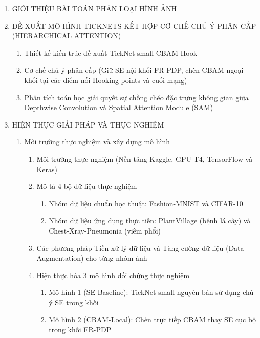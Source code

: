 \documentclass[
]{article}
\begin{document}
\begin{enumerate}
\def\labelenumi{3.\arabic{enumi}.}
\item
  GIỚI THIỆU BÀI TOÁN PHÂN LOẠI HÌNH ẢNH
\item
  ĐỀ XUẤT MÔ HÌNH TICKNETS KẾT HỢP CƠ CHẾ CHÚ Ý PHÂN CẤP (HIERARCHICAL ATTENTION)
  \begin{enumerate}
  \def\labelenumii{3.2.\arabic{enumii}.}
  \item
    Thiết kế kiến trúc đề xuất TickNet-small CBAM-Hook
  \item
    Cơ chế chú ý phân cấp (Giữ SE nội khối FR-PDP, chèn CBAM ngoại khối tại các điểm nối Hooking points và cuối mạng)
  \item
    Phân tích toán học giải quyết sự chồng chéo đặc trưng không gian giữa Depthwise Convolution và Spatial Attention Module (SAM)
  \end{enumerate}
\item
  HIỆN THỰC GIẢI PHÁP VÀ THỰC NGHIỆM
  \begin{enumerate}
  \def\labelenumii{3.3.\arabic{enumii}.}
  \item
    Môi trường thực nghiệm và xây dựng mô hình
    \begin{enumerate}
    \def\labelenumiii{3.3.1.\arabic{enumiii}.}
    \item
      Môi trường thực nghiệm (Nền tảng Kaggle, GPU T4, TensorFlow và Keras)
    \item
      Mô tả 4 bộ dữ liệu thực nghiệm
      \begin{enumerate}
      \def\labelenumiv{3.3.1.2.\arabic{enumiv}.}
      \item
        Nhóm dữ liệu chuẩn học thuật: Fashion-MNIST và CIFAR-10
      \item
        Nhóm dữ liệu ứng dụng thực tiễn: PlantVillage (bệnh lá cây) và Chest-Xray-Pneumonia (viêm phổi)
      \end{enumerate}
    \item
      Các phương pháp Tiền xử lý dữ liệu và Tăng cường dữ liệu (Data Augmentation) cho từng nhóm ảnh
    \item
      Hiện thực hóa 3 mô hình đối chứng thực nghiệm
      \begin{enumerate}
      \def\labelenumiv{3.3.1.4.\arabic{enumiv}.}
      \item
        Mô hình 1 (SE Baseline): TickNet-small nguyên bản sử dụng chú ý SE trong khối
      \item
        Mô hình 2 (CBAM-Local): Chèn trực tiếp CBAM thay SE cục bộ trong khối FR-PDP

\end{enumerate}
\end{enumerate}
\end{enumerate}
\end{enumerate}
\end{document}
